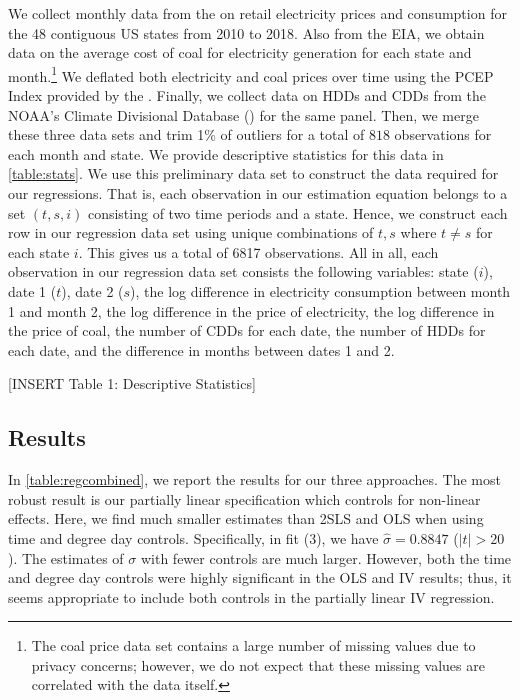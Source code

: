 \documentclass[11pt,a4paper,leqno]{extarticle}
\begin{document}
	
	We collect monthly data from the \cite{EIANetgen} on retail electricity prices and consumption for the 48 contiguous US states from 2010 to 2018. Also from the EIA, we obtain data on the average cost of coal for electricity generation for each state and month.\footnote{ The coal price data set contains a large number of missing values due to privacy concerns; however, we do not expect that these missing values are correlated with the data itself.} We deflated both electricity and coal prices over time using the PCEP Index provided by the  \cite{USBEA}. Finally, we collect data on HDDs and CDDs from the NOAA's Climate Divisional Database (\citeyear{nCLIMDIV}) for the same panel. Then, we merge these three data sets and trim 1\% of outliers for a total of $818$ observations for each month and state. We provide descriptive statistics for this data in \autoref{table:stats}. We use this preliminary data set to construct the data required for our regressions. That is, each observation in our estimation equation belongs to a set $(t,s,i)$ consisting of two time periods and a state. Hence, we construct each row in our regression data set using unique combinations of $t,s$ where $t \neq s$ for each state $i$. This gives us a total of 6817 observations.  All in all, each observation in our regression data set consists the following variables: state ($i$), date 1 ($t$), date 2 ($s$), the log difference in electricity consumption between month 1 and month 2, the log difference in the price of electricity, the log difference in the price of coal, the number of CDDs for each date, the number of HDDs for each date, and the difference in months between dates 1 and 2. 
	
	\vspace{0.15in}
	\begin{center}
		[INSERT Table 1: Descriptive Statistics]
	\end{center}
	\vspace{0.15in}
	

	
	
	\subsection{Results}
	\label{sec:results}
	
	
	
	
	In \autoref{table:regcombined}, we report the results for our three approaches. The most robust result is our partially linear specification which controls for non-linear effects.   Here, we find much smaller estimates than 2SLS and OLS when using time and degree day controls. Specifically, in fit (3), we have $\hat{\sigma} = 0.8847$ ($|t| > 20$). The estimates of $\sigma$ with fewer controls are much larger. However, both the time and degree day controls were highly significant in the OLS and IV results; thus, it seems appropriate to include both controls in the partially linear IV regression.
	
\end{document}
